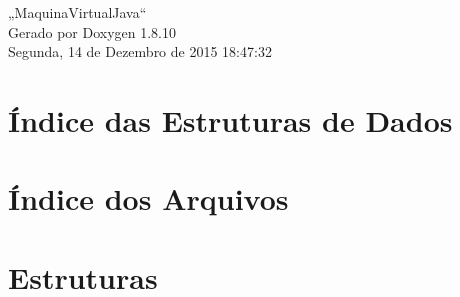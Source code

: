 \documentclass[twoside]{book}
\newcommand{\+}{\discretionary{\mbox{\scriptsize$\hookleftarrow$}}{}{}}
\newcommand{\clearemptydoublepage}{%
  \newpage{\pagestyle{empty}\cleardoublepage}%
}
\begin{document}
\hypersetup{pageanchor=false,
             bookmarks=true,
             bookmarksnumbered=true,
             pdfencoding=unicode
            }
\begin{titlepage}
\vspace*{7cm}
\begin{center}%
{\Large „\+Maquina\+Virtual\+Java“ }\\
\vspace*{1cm}
{\large Gerado por Doxygen 1.8.10}\\
\vspace*{0.5cm}
{\small Segunda, 14 de Dezembro de 2015 18:47:32}\\
\end{center}
\end{titlepage}
\clearemptydoublepage
\tableofcontents
\clearemptydoublepage
{}
\hypersetup{pageanchor=true}

\chapter{Índice das Estruturas de Dados}

\chapter{Índice dos Arquivos}

\chapter{Estruturas}

























\end{document}
